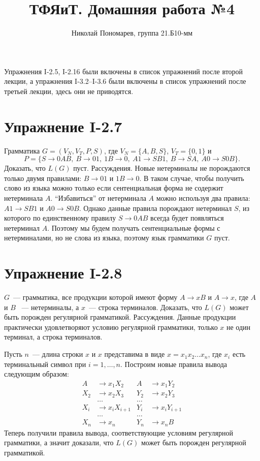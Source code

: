 \documentclass[12pt, oneside]{memoir}
\title{ТФЯиТ. Домашняя работа №4}
\author{Николай Пономарев, группа 21.Б10-мм}
\begin{document}
\maketitle

Упражнения I-2.5, I-2.16 были включены в список упражнений после второй лекции, а упражнения I-3.2--I-3.6 были включены в список упражнений после третьей лекции, здесь они не приводятся.

\section*{Упражнение I-2.7}

\begin{solution}
    {Грамматика $G = (V_N, V_T, P, S)$, где $V_N = \{A, B, S\}$, $V_T = \{0, 1\}$ и
        \[P= \{S \to 0AB,\ B \to 01,\ 1B \to 0,\ A1 \to SB1,\ B \to SA,\ A0 \to S0B\}.\]}
    {Доказать, что $L(G)$ пуст.}
    {Рассуждения.}
    Новые нетерминалы не порождаются только двумя правилами: $B \to 01$ и $1B \to 0$.
    В таком случае, чтобы получить слово из языка можно только если сентенциальная форма не содержит нетерминала $A$.
    \enquote{Избавиться} от нетерминала $A$ можно используя два правила: $A1 \to SB1$ и $A0 \to S0B$.
    Однако данные правила порождают нетерминал $S$, из которого по единственному правилу $S \to 0AB$ всегда будет появляться нетерминал $A$.
    Поэтому мы будем получать сентенциальные формы с нетерминалами, но не слова из языка, поэтому язык грамматики $G$ пуст.
\end{solution}

\section*{Упражнение I-2.8}
\begin{solution}
    {$G$~--- грамматика, все продукции которой имеют форму $A \to xB$ и $A \to x$, где $A$ и $B$ ~--- нетерминалы, а $x$~--- строка терминалов.}
    {Доказать, что $L(G)$ может быть порожден регулярной грамматикой.}
    {Рассуждения.}
    Данные продукции практически удовлетворяют условию регулярной грамматики, только $x$ не один терминал, а строка терминалов.

    Пусть $n$~--- длина строки $x$ и $x$ представима в виде $x = x_1 x_2 \dots x_n$, где $x_i$ есть терминальный символ при $i = 1, \dots, n$.
    Построим новые правила вывода следующим образом:
    \begin{align*}
        A   & \to x_1 X_2     & A     & \to x_1 Y_2     \\
        X_2 & \to x_2 X_3     & Y_2   & \to x_2 Y_3     \\
            & \dots           & \dots                   \\
        X_i & \to x_i X_{i+1} & Y_i   & \to x_i Y_{i+1} \\
            & \dots           & \dots                   \\
        X_n & \to x_n         & Y_n   & \to x_n B
    \end{align*}
    Теперь получили правила вывода, соответствующие условиям регулярной грамматики, а значит доказали, что $L(G)$ может быть порожден регулярной грамматикой.
\end{solution}
\end{document}
